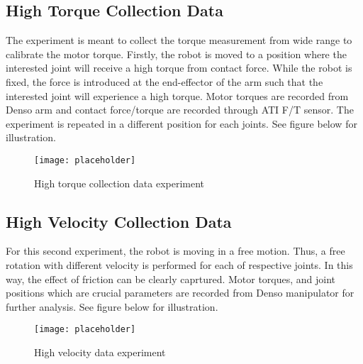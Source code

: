 \subsection{High Torque Collection Data}
\label{push exp}

The experiment is meant to collect the torque measurement from wide range to calibrate the motor torque. Firstly, the robot is moved to a position where the interested joint will receive a high torque from contact force. While the robot is fixed, the force is introduced at the end-effector of the arm such that the interested joint will experience a high torque. Motor torques are recorded from Denso arm and contact force/torque are recorded through ATI F/T sensor. The experiment is repeated in a different position for each joints. See figure below for illustration.

\begin{figure}[h]
    \centering
    \texttt{[image: placeholder]}
    \caption{High torque collection data experiment}
\end{figure}


\subsection{High Velocity Collection Data}
\label{fric exp}

For this second experiment, the robot is moving in a free motion. Thus, a free rotation with different velocity is performed for each of respective joints. In this way, the effect of friction can be clearly caprtured. Motor torques, and joint positions which are crucial parameters are recorded from Denso manipulator for further analysis. See figure below for illustration.
\begin{figure}[h]
    \centering
    \texttt{[image: placeholder]}
    \caption{High velocity data experiment}
\end{figure}


